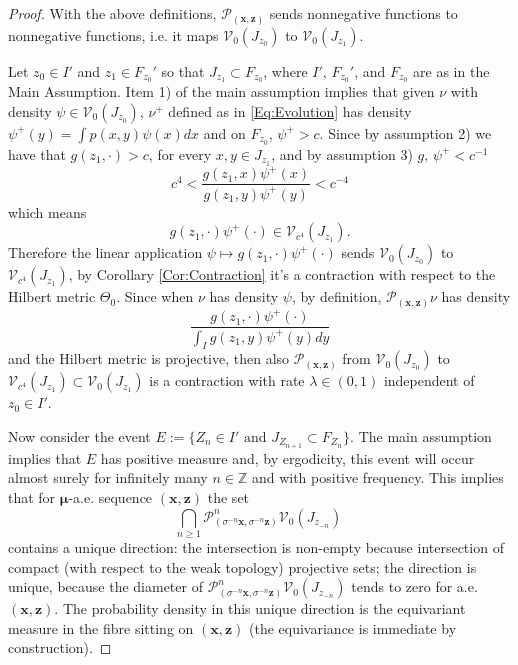 \documentclass[10pt,a4paper]{amsart}
\newcommand{\Z}{\mathbb Z}
\newcommand{\bo}{\boldsymbol}
\newcommand{\mc}{\mathcal}
\begin{document}
\begin{proof}
 With the above definitions, $\mc P_{(\bo x, \bo z)}$ sends nonnegative functions to nonnegative functions, i.e. it maps $\mc V_0(J_{z_0}) $ to $\mc V_0(J_{z_1})$.

Let $z_0\in I'$ and $z_1\in F_{z_0}'$ so that $J_{z_{1}}\subset F_{z_0}$, where $I'$, $F_{z_0}'$, and $F_{z_0}$ are as in the Main Assumption. Item 1) of the main assumption implies that given $\nu$ with density $\psi\in \mc V_0(J_{z_0})$, $\nu^+$ defined as in \eqref{Eq:Evolution} has density $\psi^+(y)=\int p(x,y)\psi(x)dx$ and  on $F_{z_{0}}$, $\psi^+>c$.  Since by assumption 2) we have that $g(z_{1},\cdot)>c$, for every $x,y\in J_{z_1}$, and by assumption 3) $g,\,\psi^+<c^{-1}$
\[
c^4<\frac{g(z_{1},x)\psi^+(x)}{g(z_{1},y)\psi^+(y)} < c^{-4}
\]
which means
\[
g(z_{1},\cdot)\psi^+(\cdot)\in \mc V_{c^4}(J_{z_1}).
\]
Therefore the linear application $\psi\mapsto g(z_{1},\cdot)\psi^+(\cdot)$ sends $\mc V_0(J_{z_0})$ to $\mc V_{c^4}(J_{z_{1}})$, by Corollary \ref{Cor:Contraction} it's a contraction with respect to the Hilbert metric $\Theta_0$. Since when $\nu$ has density $\psi$, by definition, $\mc P_{(\bo x,\bo z)}\nu$ has density
\[
\frac{g(z_{1},\cdot)\psi^+(\cdot)}{\int_Ig(z_{1},y)\psi^+(y)dy}
\]
and the Hilbert metric is projective, then also $\mc P_{(\bo x,\bo z )}$ from $\mc V_0(J_{z_0})$ to  $\mc V_{c^4}(J_{z_1})\subset\mc V_{0}(J_{z_1})$ is a contraction with rate $\lambda\in(0,1)$ independent of $z_0\in I'$.

Now consider the event $E:=\{Z_n\in I' \mbox{ and } J_{Z_{n+1}}\subset F_{Z_n} \}$. The main assumption implies that $E$ has positive measure and, by ergodicity, this event will occur almost surely for infinitely many $n\in \Z$ and with positive frequency.  This implies that for $\bo \mu$-a.e. sequence $(\bo x, \bo z)$ the set
\[
\bigcap_{n\ge 1} \mc P^n_{(\sigma^{-n}\bo x,\sigma^{-n}\bo z)} \mc V_0(J_{z_{-n}})\
\]
contains a unique direction: the intersection is non-empty because intersection of compact (with respect to the weak topology) projective sets; the direction is unique, because the diameter of $\mc P^n_{(\sigma^{-n}\bo x,\sigma^{-n}\bo z)} \mc V_0(J_{z_{-n}})$ tends to zero for a.e. $(\bo x, \bo z)$. The probability density in this unique direction is the equivariant measure in the fibre sitting on $(\bo x, \bo z)$ (the equivariance is immediate by construction).
\end{proof}
\end{document}
